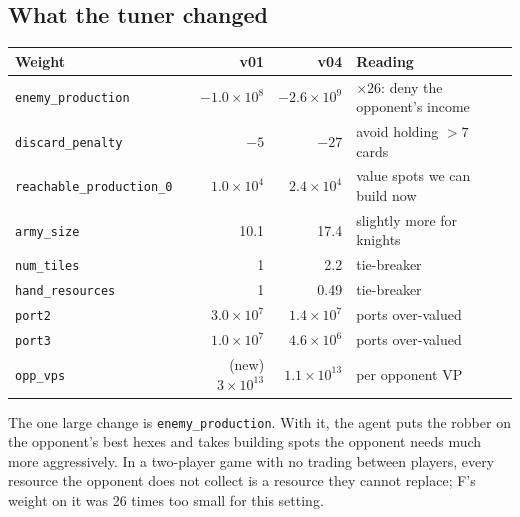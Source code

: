 \documentclass[11pt]{article}
\begin{document}
\subsection*{What the tuner changed}
\begin{center}
\begin{tabular}{lrrl}
\toprule
Weight & v01 & v04 & Reading \\
\midrule
\texttt{enemy\_production} & $-1.0\times10^{8}$ & $-2.6\times10^{9}$ & $\times 26$: deny the opponent's income \\
\texttt{discard\_penalty} & $-5$ & $-27$ & avoid holding $>7$ cards \\
\texttt{reachable\_production\_0} & $1.0\times10^{4}$ & $2.4\times10^{4}$ & value spots we can build now \\
\texttt{army\_size} & 10.1 & 17.4 & slightly more for knights \\
\texttt{num\_tiles} & 1 & 2.2 & tie-breaker \\
\texttt{hand\_resources} & 1 & 0.49 & tie-breaker \\
\texttt{port2} & $3.0\times10^{7}$ & $1.4\times10^{7}$ & ports over-valued \\
\texttt{port3} & $1.0\times10^{7}$ & $4.6\times10^{6}$ & ports over-valued \\
\texttt{opp\_vps} & (new) $3\times10^{13}$ & $1.1\times10^{13}$ & per opponent VP \\
\bottomrule
\end{tabular}
\end{center}
The one large change is \texttt{enemy\_production}. With it, the agent puts the robber on the
opponent's best hexes and takes building spots the opponent needs much more aggressively. In a
two-player game with no trading between players, every resource the opponent does not collect is
a resource they cannot replace; F's weight on it was 26 times too small for this setting.
\end{document}
